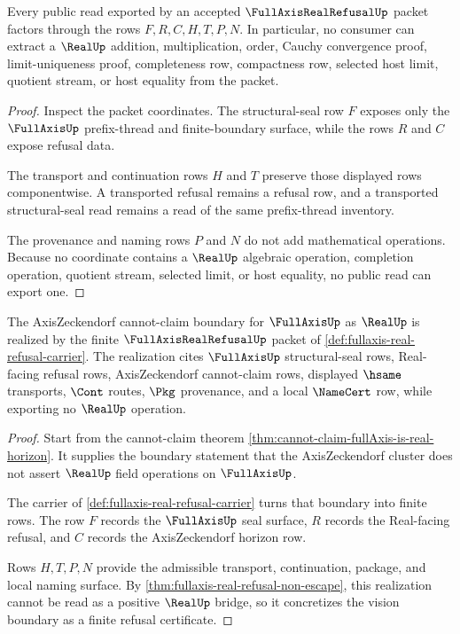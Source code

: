 \begin{theorem}
\label{thm:fullaxis-real-refusal-non-escape}
Every public read exported by an accepted $\FullAxisRealRefusalUp$ packet factors through the rows $F,R,C,H,T,P,N$. In particular, no consumer can extract a $\RealUp$ addition, multiplication, order, Cauchy convergence proof, limit-uniqueness proof, completeness row, compactness row, selected host limit, quotient stream, or host equality from the packet.
\end{theorem}
\begin{proof}
Inspect the packet coordinates. The structural-seal row $F$ exposes only the $\FullAxisUp$ prefix-thread and finite-boundary surface, while the rows $R$ and $C$ expose refusal data.

The transport and continuation rows $H$ and $T$ preserve those displayed rows componentwise. A transported refusal remains a refusal row, and a transported structural-seal read remains a read of the same prefix-thread inventory.

The provenance and naming rows $P$ and $N$ do not add mathematical operations. Because no coordinate contains a $\RealUp$ algebraic operation, completion operation, quotient stream, selected limit, or host equality, no public read can export one.
\end{proof}

\begin{theorem}
\label{thm:fullaxis-real-refusal-vision-concretization}
The AxisZeckendorf cannot-claim boundary for $\FullAxisUp$ as $\RealUp$ is realized by the finite $\FullAxisRealRefusalUp$ packet of \autoref{def:fullaxis-real-refusal-carrier}. The realization cites $\FullAxisUp$ structural-seal rows, Real-facing refusal rows, AxisZeckendorf cannot-claim rows, displayed $\hsame$ transports, $\Cont$ routes, $\Pkg$ provenance, and a local $\NameCert$ row, while exporting no $\RealUp$ operation.
\end{theorem}
\begin{proof}
Start from the cannot-claim theorem \autoref{thm:cannot-claim-fullAxis-is-real-horizon}. It supplies the boundary statement that the AxisZeckendorf cluster does not assert $\RealUp$ field operations on $\FullAxisUp$.

The carrier of \autoref{def:fullaxis-real-refusal-carrier} turns that boundary into finite rows. The row $F$ records the $\FullAxisUp$ seal surface, $R$ records the Real-facing refusal, and $C$ records the AxisZeckendorf horizon row.

Rows $H,T,P,N$ provide the admissible transport, continuation, package, and local naming surface. By \autoref{thm:fullaxis-real-refusal-non-escape}, this realization cannot be read as a positive $\RealUp$ bridge, so it concretizes the vision boundary as a finite refusal certificate.
\end{proof}

